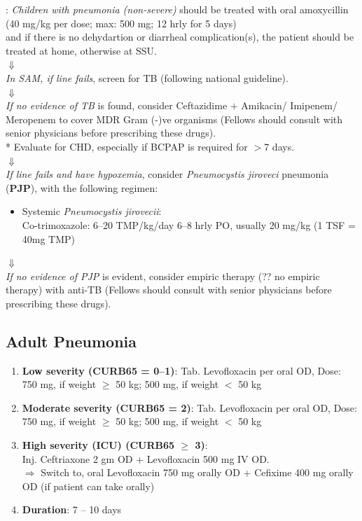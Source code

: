 \documentclass[11pt,a4paper]{report}
\begin{document}
: \textit{Children with pneumonia (non-severe)} should be treated with oral amoxycillin (40 mg/kg per dose; max: 500 mg; 12 hrly for 5 days)\\ 
and if there is no dehydartion or diarrheal complication(s), the patient should be treated at home, otherwise at SSU. \\
$\Downarrow$\\
\textit{In SAM, if  line fails}, screen for TB (following national guideline). \\
$\Downarrow$\\
\textit{If no evidence of TB} is found, consider Ceftazidime $+$ Amikacin/ Imipenem/ Meropenem to cover MDR Gram (-)ve organisms (Fellows should consult with senior physicians before prescribing these drugs). \\{\color{red}*} Evaluate for CHD, especially if BCPAP is required for $>$7 days.\\
$\Downarrow$\\
\textit{If  line fails and have hypoxemia}, consider \textit{Pneumocystis jiroveci} pneumonia (\textbf{PJP}), with the following regimen:
\begin{itemize}
	\item Systemic \textit{Pneumocystis jirovecii}: \\
	Co-trimoxazole: 6--20 TMP/kg/day 6--8 hrly PO, usually 20 mg/kg (1 TSF = 40mg TMP)
\end{itemize}
$\Downarrow$\\
\textit{If no evidence of PJP} is evident, consider empiric therapy {\color{red}(?? no empiric therapy)} with anti-TB (Fellows should consult with senior physicians before prescribing these drugs).

\subsection{Adult Pneumonia}
\begin{enumerate}
	\item \textbf{Low severity (CURB65 = 0--1)}: Tab. Levofloxacin per oral OD, Dose: 750 mg, if weight $\geq$ 50 kg; 500 mg, if weight $<$ 50 kg
	\item \textbf{Moderate severity (CURB65 = 2)}: Tab. Levofloxacin per oral OD, Dose: 750 mg, if weight $\geq$ 50 kg; 500 mg, if weight $<$ 50 kg
	\item \textbf{High severity (ICU) (CURB65 $\geq$ 3)}: \\
	Inj. Ceftriaxone 2 gm OD + Levofloxacin 500 mg IV OD. \\
	$\Rightarrow$ Switch to, oral Levofloxacin 750 mg orally OD + Cefixime 400 mg orally OD (if patient can take orally)
	\item \textbf{Duration}: 7 -- 10 days 
\end{enumerate}
\end{document}
